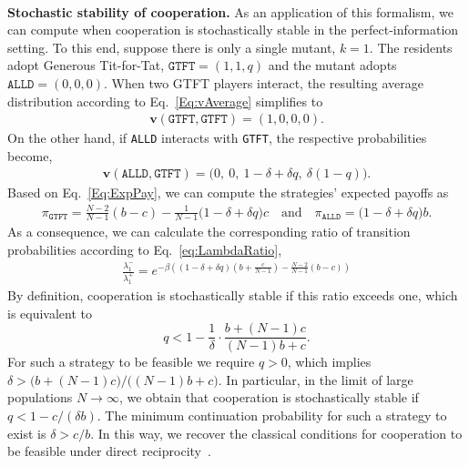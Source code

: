 \documentclass[11pt]{article}
\def\alld{\texttt{ALLD}}
\def\gtft{\texttt{GTFT}}
\theoremstyle{plainCl1}
\theoremstyle{plainCl2}
\begin{document}
~\\
{\bf Stochastic stability of cooperation.}
As an application of this formalism, we can compute when cooperation is stochastically stable in the perfect-information setting. 
To this end, suppose there is only a single mutant, $k\!=\!1$. The residents adopt Generous Tit-for-Tat, $\gtft = (1, 1, q)$ and the mutant adopts $\alld\! = \! (0,0,0)$. When two GTFT players interact, the resulting average distribution according to Eq.~\eqref{Eq:vAverage} simplifies to
\begin{align*}
\mathbf{v}(\gtft,\gtft) = (1, 0, 0, 0).
\end{align*}
On the other hand, if \alld{} interacts with \gtft, the respective probabilities become,
\begin{align*}
  \mathbf{v}(\alld,\gtft) = \big(0,~0,~1\!-\!\delta\!+\!\delta q,~\delta(1\! -\! q)\big).
\end{align*}
Based on Eq.~\eqref{Eq:ExpPay}, we can compute the strategies' expected payoffs as
\begin{align*}
\pi_\gtft =  \frac{N\!-\!2}{N-1} (b - c)  \!-\! \frac{1}{N-1}\big(1\!-\!\delta\!+\!\delta q\big)c
\quad \text{and} \quad
\pi_\alld  = \big(1\!-\!\delta\!+\!\delta q\big)b.
\end{align*}
As a consequence, we can calculate the corresponding ratio of transition probabilities according to Eq.~\eqref{eq:LambdaRatio},
\begin{align*}
\frac{\lambda_1^{-}}{\lambda_1^{+}} = e^{-\beta \left( (1-\delta+\delta q)(b+\frac{c}{N-1})- \frac{N-2}{N-1}(b-c) \right)}
\end{align*}
By definition, cooperation is stochastically stable if this ratio exceeds one, which is equivalent to
\begin{equation*}
q<1-\frac{1}{\delta}\cdot \frac{b+(N\!-\!1)c}{(N\!-\!1)b+c}.
\end{equation*}
For such a strategy to be feasible we require $q\!>\!0$, which implies $\delta \!>\! \big(b+(N\!-\!1)c\big)/\big((N\!-\!1)b\!+\!c\big)$.
In particular, in the limit of large populations \(N \!\rightarrow\! \infty\), we obtain that cooperation is stochastically stable if  \(q \!<\! 1\! -\! c/(\delta b)\). 
The minimum continuation probability for such a strategy to exist is $\delta \!>\! c/b$. 
In this way, we recover the classical conditions for cooperation to be feasible under direct reciprocity~\citep{molander:jcr:1985,Nowak1992tit,Schmid:NHB:2021}.



\end{document}

